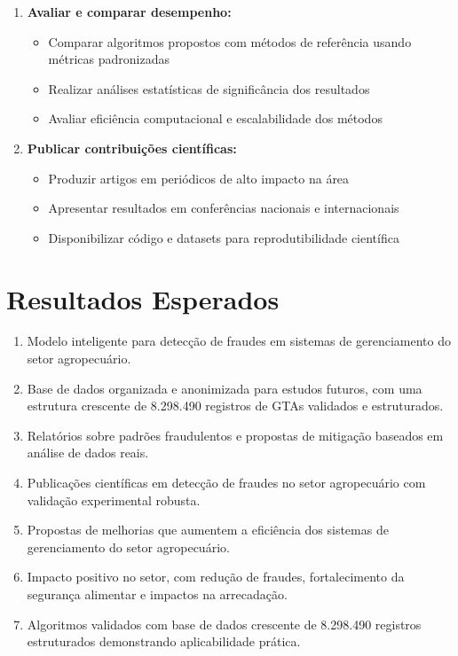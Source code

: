 \begin{enumerate}
  \item \textbf{Avaliar e comparar desempenho:} 
  \begin{itemize}
    \item Comparar algoritmos propostos com métodos de referência usando métricas padronizadas
    \item Realizar análises estatísticas de significância dos resultados
    \item Avaliar eficiência computacional e escalabilidade dos métodos
  \end{itemize}
  
  \item \textbf{Publicar contribuições científicas:} 
  \begin{itemize}
    \item Produzir artigos em periódicos de alto impacto na área
    \item Apresentar resultados em conferências nacionais e internacionais
    \item Disponibilizar código e datasets para reprodutibilidade científica
  \end{itemize}
\end{enumerate}

\section{Resultados Esperados}

\begin{enumerate}
  \item Modelo inteligente para detecção de fraudes em sistemas de gerenciamento do setor agropecuário.
  \item Base de dados organizada e anonimizada para estudos futuros, com uma estrutura crescente de 8.298.490 registros de GTAs validados e estruturados.
  \item Relatórios sobre padrões fraudulentos e propostas de mitigação baseados em análise de dados reais.
  \item Publicações científicas em detecção de fraudes no setor agropecuário com validação experimental robusta.
  \item Propostas de melhorias que aumentem a eficiência dos sistemas de gerenciamento do setor agropecuário.
  \item Impacto positivo no setor, com redução de fraudes, fortalecimento da segurança alimentar e impactos na arrecadação.
  \item Algoritmos validados com base de dados crescente de 8.298.490 registros estruturados demonstrando aplicabilidade prática.
\end{enumerate}